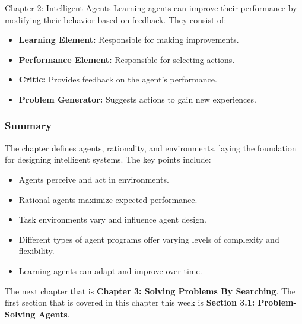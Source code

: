 \begin{notes}{Chapter 2: Intelligent Agents}
    Learning agents can improve their performance by modifying their behavior based on feedback. They consist of:
    \begin{itemize}
        \item \textbf{Learning Element:} Responsible for making improvements.
        \item \textbf{Performance Element:} Responsible for selecting actions.
        \item \textbf{Critic:} Provides feedback on the agent's performance.
        \item \textbf{Problem Generator:} Suggests actions to gain new experiences.
    \end{itemize}

    \subsubsection*{Summary}

    The chapter defines agents, rationality, and environments, laying the foundation for designing intelligent systems. The key points include:
    \begin{itemize}
        \item Agents perceive and act in environments.
        \item Rational agents maximize expected performance.
        \item Task environments vary and influence agent design.
        \item Different types of agent programs offer varying levels of complexity and flexibility.
        \item Learning agents can adapt and improve over time.
    \end{itemize}
\end{notes}

The next chapter that is \textbf{Chapter 3: Solving Problems By Searching}. The first section that is covered in this chapter this week is \textbf{Section 3.1: Problem-Solving Agents}.

